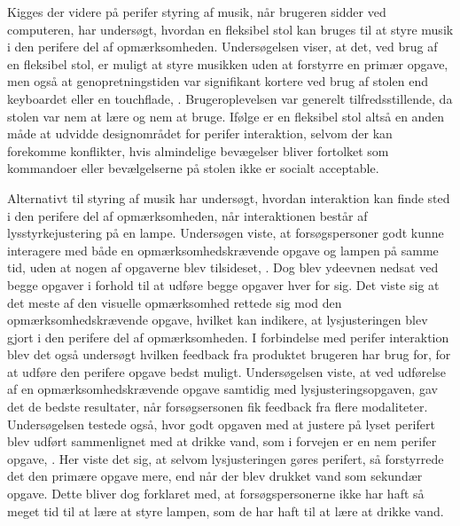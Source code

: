 Kigges der videre på perifer styring af musik, når brugeren sidder ved computeren, har \textcite[ss. 5-9]{PDF:AChairAsUbiquitousInputDevice} undersøgt, hvordan en fleksibel stol kan bruges til at styre musik i den perifere del af opmærksomheden. Undersøgelsen viser, at det, ved brug af en fleksibel stol, er muligt at styre musikken uden at forstyrre en primær opgave, men også at genopretningstiden var signifikant kortere ved brug af stolen end keyboardet eller en touchflade, \parencite[s. 7]{PDF:AChairAsUbiquitousInputDevice}. Brugeroplevelsen var generelt tilfredsstillende, da stolen var nem at lære og nem at bruge. Ifølge \textcite[s. 8]{PDF:AChairAsUbiquitousInputDevice} er en fleksibel stol altså en anden måde at udvidde designområdet for perifer interaktion, selvom der kan forekomme konflikter, hvis almindelige bevægelser bliver fortolket som kommandoer eller bevælgelserne på stolen ikke er socialt acceptable.

Alternativt til styring af musik har \textcite[s. 1]{PDF:FacilitatingPIDesignAndEvaluation} undersøgt, hvordan interaktion kan finde sted i den perifere del af opmærksomheden, når interaktionen består af lysstyrkejustering på en lampe. Undersøgen viste, at forsøgspersoner godt kunne interagere med både en opmærksomhedskrævende opgave og lampen på samme tid, uden at nogen af opgaverne blev tilsideset, \parencite[ss. 20-21]{PDF:FacilitatingPIDesignAndEvaluation}. Dog blev ydeevnen nedsat ved begge opgaver i forhold til at udføre begge opgaver hver for sig. Det viste sig at det meste af den visuelle opmærksomhed rettede sig mod den opmærksomhedskrævende opgave, hvilket kan indikere, at lysjusteringen blev gjort i den perifere del af opmærksomheden. I forbindelse med perifer interaktion blev det også undersøgt hvilken feedback fra produktet brugeren har brug for, for at udføre den perifere opgave bedst muligt. Undersøgelsen viste, at ved udførelse af en opmærksomhedskrævende opgave samtidig med lysjusteringsopgaven, gav det de bedste resultater, når forsøgsersonen fik feedback fra flere modaliteter.  Undersøgelsen testede også, hvor godt opgaven med at justere på lyset perifert blev udført sammenlignet med at drikke vand, som i forvejen er en nem perifer opgave, \parencite[s. 20]{PDF:FacilitatingPIDesignAndEvaluation}. Her viste det sig, at selvom lysjusteringen gøres perifert, så forstyrrede det den primære opgave mere, end når der blev drukket vand som sekundær opgave. Dette bliver dog forklaret med, at forsøgspersonerne ikke har haft så meget tid til at lære at styre lampen, som de har haft til at lære at drikke vand. 

